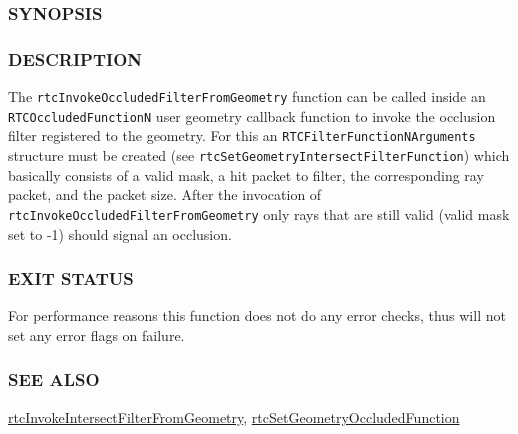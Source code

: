 \subsubsection{SYNOPSIS}\label{synopsis}

\begin{Shaded}
\begin{Highlighting}[]

\OperatorTok{(}
   \OperatorTok{*}\OperatorTok{,}
   \OperatorTok{*}
\OperatorTok{);}
\end{Highlighting}
\end{Shaded}

\subsubsection{DESCRIPTION}\label{description}

The \texttt{rtcInvokeOccludedFilterFromGeometry} function can be called
inside an \texttt{RTCOccludedFunctionN} user geometry callback function
to invoke the occlusion filter registered to the geometry. For this an
\texttt{RTCFilterFunctionNArguments} structure must be created (see
\texttt{rtcSetGeometryIntersectFilterFunction}) which basically consists
of a valid mask, a hit packet to filter, the corresponding ray packet,
and the packet size. After the invocation of
\texttt{rtcInvokeOccludedFilterFromGeometry} only rays that are still
valid (valid mask set to -1) should signal an occlusion.

\subsubsection{EXIT STATUS}\label{exit-status}

For performance reasons this function does not do any error checks, thus
will not set any error flags on failure.

\subsubsection{SEE ALSO}\label{see-also}

\hyperref[rtcinvokeintersectfilterfromgeometry]{rtcInvokeIntersectFilterFromGeometry},
\hyperref[rtcsetgeometryoccludedfunction]{rtcSetGeometryOccludedFunction}

